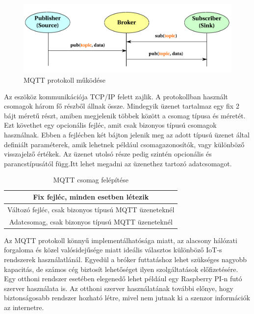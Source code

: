 \begin{figure}[!ht]
    \centering
    \includegraphics[width=130mm, keepaspectratio]{figures/mqtt.png}
    \caption{MQTT protokoll működése  \cite{MQTT:article} }
    \label{fig:mqtt}
\end{figure}

Az eszököz kommunikációja TCP/IP felett zajlik. A protokollban használt csomagok három fő részből állnak össze. Mindegyik üzenet tartalmaz egy fix 2 bájt méretű részt, amiben megjelenik többek között a csomag típusa és méretét. Ezt követhet egy opcionális fejléc, amit csak bizonyos típusú csomagok használnak. Ebben a fejlécben két bájton jelenik meg az adott típusú üzenet által definiált paraméterek, amik lehetnek például csomagazonosítók, vagy különböző visszajelző értékek. Az üzenet utolsó része pedig szintén opcionális és parancstípusától függ.Itt lehet megadni az üzenethez tartozó adatcsomagot.


\begin{table}[ht]
	\footnotesize
	\centering
	\begin{tabular}{|c|}
		\hline
		Fix fejléc, minden esetben létezik \\
		\hline
		Változó fejléc, csak bizonyos típusú MQTT üzeneteknél \\
		\hline
		Adatcsomag, csak bizonyos típusú MQTT üzeneteknél\\
		\hline
	\end{tabular}
	\caption{MQTT csomag felépítése}
	\label{tab:mqtt_package_format}
\end{table}


Az MQTT protokoll könnyű implementálhatósága miatt, az alacsony hálózati forgaloma és közel valósidejűsége miatt ideális választos különböző IoT-s rendszerek használatlánál. Egyedül a bróker futtatáshoz lehet szükséges nagyobb kapacitás, de számos cég biztosít lehetőséget ilyen szolgáltatások előfizetésére. Egy otthoni rendszer esetében elegenedő lehet például egy Raspberry PI-n futó szerver használata is. Az otthoni szerver használatának további előnye, hogy biztonságosabb rendszer hozható létre, mivel nem jutnak ki a szenzor információk az internetre.

